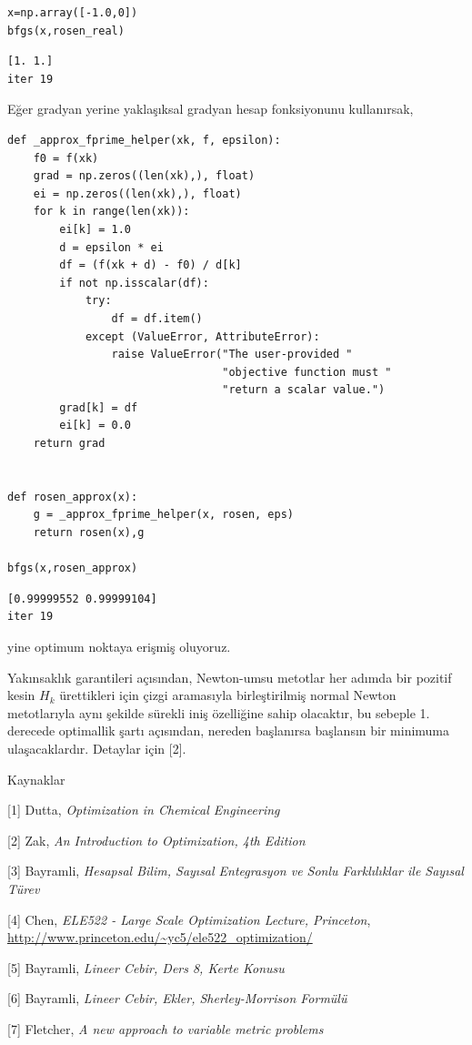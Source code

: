 \documentclass[12pt,fleqn]{article}\usepackage{../../common}
\begin{document}
\begin{verbatim}
x=np.array([-1.0,0])
bfgs(x,rosen_real)    
\end{verbatim}

\begin{verbatim}
[1. 1.]
iter 19
\end{verbatim}

Eğer gradyan yerine yaklaşıksal gradyan hesap fonksiyonunu kullanırsak,

\begin{verbatim}
def _approx_fprime_helper(xk, f, epsilon):
    f0 = f(xk)
    grad = np.zeros((len(xk),), float)
    ei = np.zeros((len(xk),), float)
    for k in range(len(xk)):
        ei[k] = 1.0
        d = epsilon * ei
        df = (f(xk + d) - f0) / d[k]
        if not np.isscalar(df):
            try:
                df = df.item()
            except (ValueError, AttributeError):
                raise ValueError("The user-provided "
                                 "objective function must "
                                 "return a scalar value.")
        grad[k] = df
        ei[k] = 0.0
    return grad


def rosen_approx(x):
    g = _approx_fprime_helper(x, rosen, eps)
    return rosen(x),g

bfgs(x,rosen_approx)
\end{verbatim}

\begin{verbatim}
[0.99999552 0.99999104]
iter 19
\end{verbatim}

yine optimum noktaya erişmiş oluyoruz.

Yakınsaklık garantileri açısından, Newton-umsu metotlar her adımda bir
pozitif kesin $H_k$ ürettikleri için çizgi aramasıyla birleştirilmiş normal
Newton metotlarıyla aynı şekilde sürekli iniş özelliğine sahip olacaktır,
bu sebeple 1. derecede optimallik şartı açısından, nereden başlanırsa
başlansın bir minimuma ulaşacaklardır. Detaylar için [2].

Kaynaklar 

[1] Dutta, {\em Optimization in Chemical Engineering}

[2] Zak, {\em An Introduction to Optimization, 4th Edition}

[3] Bayramli, {\em Hesapsal Bilim, Sayısal Entegrasyon ve Sonlu Farklılıklar ile Sayısal Türev}

[4] Chen, {\em ELE522 - Large Scale Optimization Lecture, Princeton},
    \url{http://www.princeton.edu/~yc5/ele522_optimization/}

[5] Bayramli, {\em Lineer Cebir, Ders 8, Kerte Konusu}

[6] Bayramli, {\em Lineer Cebir, Ekler, Sherley-Morrison Formülü}

[7] Fletcher, {\em A new approach to variable metric problems}
\end{document}
